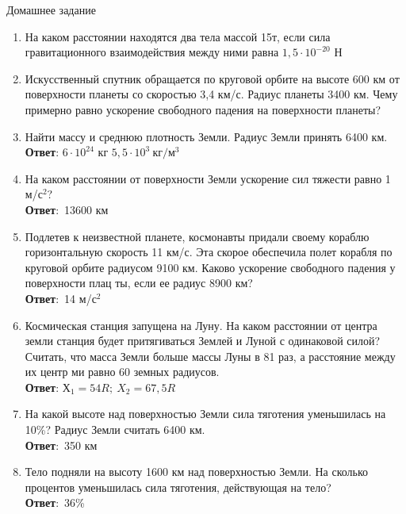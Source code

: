 \documentclass[a5paper, 10pt]{diss_4}
\renewcommand{\'}{\,'}
\begin{document}
\begin{center}
   Домашнее задание
\end{center}
\begin{enumerate}

  \item На каком расстоянии находятся два тела массой 15т, если сила
гравитационного взаимодействия между ними равна $1,5\cdot10^{-20}$ Н

  \item Искусственный спутник обращается по круговой орбите на высоте 600 км от
 поверхности планеты со скоростью 3,4 км/с. Радиус планеты 3400 км. Чему
примерно равно ускорение свободного падения на поверхности планеты?

  \item Найти массу и среднюю плотность Земли. Радиус Земли принять 6400 км.
\\\textbf{Ответ}: $6\cdot10^{24}$ кг $5,5\cdot10^3\ кг/м^3$

  \item На каком расстоянии от поверхности Земли ускорение сил тяжести равно 1
м/$с^2$?\\\textbf{Ответ}:\ 13600 км

  \item Подлетев к неизвестной планете, космонавты придали своему кораблю
горизонтальную скорость 11 км/с. Эта скорое обеспечила полет корабля по
круговой орбите радиусом 9100 км. Каково ускорение свободного падения у
поверхности плац ты, если ее радиус 8900 км?\\\textbf{Ответ}:\ 14 м/$с^2$

  \item Космическая станция запущена на Луну. На каком расстоянии от центра
земли станция будет притягиваться Землей и Луной с одинаковой силой? Считать,
что масса Земли больше массы Луны в 81 раз, а расстояние между их центр ми
равно 60 земных радиусов.\\\textbf{Ответ}: $Х_1=54R;\ X_2=67,5R$

  \item На какой высоте над поверхностью Земли сила тяготения уменьшилась на
10\%? Радиус Земли считать 6400 км.\\\textbf{Ответ}:\ 350 км

  \item Тело подняли на высоту 1600 км над поверхностью Земли. На сколько
процентов уменьшилась сила тяготения, действующая на тело?\\\textbf{Ответ}:\
36\%

\end{enumerate}
\end{document}
